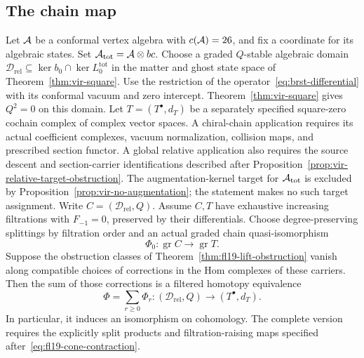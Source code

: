\subsection{The chain map}

\begin{theorem}
\label{thm:brst-bar-genus0}
Let $\mathcal{A}$ be a conformal vertex algebra with $c(\mathcal{A})=26$, and fix a coordinate for its algebraic states. Set $\mathcal{A}_{\mathrm{tot}}=\mathcal{A}\otimes bc$.
Choose a graded $Q$-stable algebraic domain
$\mathcal D_{\mathrm{rel}}\subseteq\ker b_0\cap\ker L_0^{\mathrm{tot}}$
in the matter and ghost state space of Theorem~\ref{thm:vir-square}.
Use the restriction of the operator~\eqref{eq:brst-differential} with its conformal vacuum and zero intercept.
Theorem~\ref{thm:vir-square} gives $Q^2=0$ on this domain.
Let $T=(T^\bullet,d_T)$ be a separately specified square-zero cochain complex of complex vector spaces.
A chiral-chain application requires its actual coefficient complexes, vacuum normalization, collision maps, and prescribed section functor.
A global relative application also requires the source descent and section-carrier identifications described after Proposition~\ref{prop:vir-relative-target-obstruction}.
The augmentation-kernel target for $\mathcal{A}_{\mathrm{tot}}$ is excluded by Proposition~\ref{prop:vir-no-augmentation}; the statement makes no such target assignment.
Write $C=(\mathcal D_{\mathrm{rel}},Q)$.
Assume $C,T$ have exhaustive increasing filtrations with $F_{-1}=0$, preserved by their differentials.
Choose degree-preserving splittings by filtration order and an actual graded chain quasi-isomorphism
\begin{equation}\label{eq:arkhipov-classical}
\Phi_0:\operatorname{gr}C\longrightarrow\operatorname{gr}T.
\end{equation}
Suppose the obstruction classes of Theorem~\ref{thm:fl19-lift-obstruction} vanish along compatible choices of corrections in the Hom complexes of these carriers.
Then the sum of those corrections is a filtered homotopy equivalence
\[
\Phi=\sum_{r\ge0}\Phi_r:
(\mathcal D_{\mathrm{rel}},Q)\longrightarrow
(T^\bullet,d_T).
\]
In particular, it induces an isomorphism on cohomology.
The complete version requires the explicitly split products and filtration-raising maps specified after~\eqref{eq:fl19-cone-contraction}.
\end{theorem}
